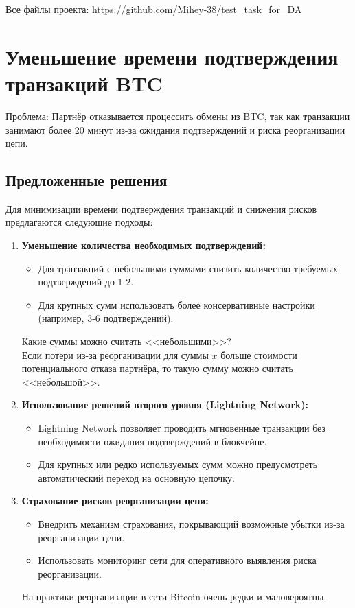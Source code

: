 \documentclass[12pt]{article}
\theoremstyle{indented}
\theoremstyle{definition}
\theoremstyle{remark}
\begin{document}
Все файлы проекта: https://github.com/Mihey-38/test\_task\_for\_DA

\section{Уменьшение времени подтверждения транзакций BTC}

Проблема: Партнёр отказывается процессить обмены из BTC, так как транзакции занимают более 20 минут из-за ожидания подтверждений и риска реорганизации цепи.

\subsection*{Предложенные решения}
Для минимизации времени подтверждения транзакций и снижения рисков предлагаются следующие подходы:

\begin{enumerate}
    \item \textbf{Уменьшение количества необходимых подтверждений:}
    \begin{itemize}
        \item Для транзакций с небольшими суммами снизить количество требуемых подтверждений до 1-2.
        \item Для крупных сумм использовать более консервативные настройки (например, 3-6 подтверждений).
    \end{itemize}
    Какие суммы можно считать <<небольшими>>? \\
    Если потери из-за реорганизации для суммы $x$ больше стоимости потенциального отказа партнёра, то такую сумму можно считать <<небольшой>>.

    \item \textbf{Использование решений второго уровня (Lightning Network):}
    \begin{itemize}
        \item Lightning Network позволяет проводить мгновенные транзакции без необходимости ожидания подтверждений в блокчейне.
        \item Для крупных или редко используемых сумм можно предусмотреть автоматический переход на основную цепочку.
    \end{itemize}

    \item \textbf{Страхование рисков реорганизации цепи:}
    \begin{itemize}
        \item Внедрить механизм страхования, покрывающий возможные убытки из-за реорганизации цепи.
        \item Использовать мониторинг сети для оперативного выявления риска реорганизации.
    \end{itemize}
    На практики реорганизации в сети Bitcoin очень редки и маловероятны.
\end{enumerate}
\end{document}
